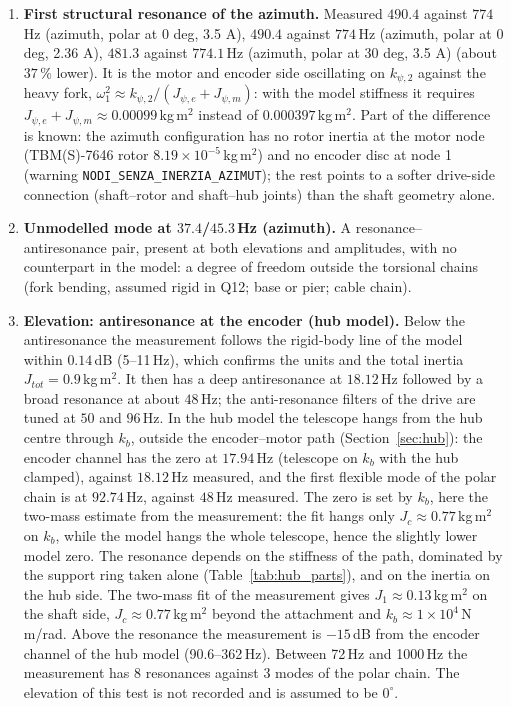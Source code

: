 \documentclass[10pt,a4paper]{article}
\numberwithin{equation}{section}
\begin{document}
\begin{enumerate}
\item \textbf{First structural resonance of the azimuth.} Measured $490.4$ against $774$\,Hz (azimuth, polar at 0 deg, 3.5 A), $490.4$ against $774$\,Hz (azimuth, polar at 0 deg, 2.36 A), $481.3$ against $774.1$\,Hz (azimuth, polar at 30 deg, 3.5 A) (about $37\,\%$ lower). It is the motor and encoder side oscillating on $k_{\psi,2}$ against the heavy fork, $\omega_1^2\approx k_{\psi,2}/(J_{\psi,e} + J_{\psi,m})$: with the model stiffness it requires $J_{\psi,e} + J_{\psi,m} \approx 0.00099$\,kg\,m$^2$ instead of $0.000397$\,kg\,m$^2$. Part of the difference is known: the azimuth configuration has no rotor inertia at the motor node (TBM(S)-7646 rotor $8.19\times10^{-5}$\,kg\,m$^2$) and no encoder disc at node 1 (warning \texttt{NODI\_SENZA\_INERZIA\_AZIMUT}); the rest points to a softer drive-side connection (shaft--rotor and shaft--hub joints) than the shaft geometry alone.
\item \textbf{Unmodelled mode at $37.4$/$45.3$\,Hz (azimuth).} A resonance--antiresonance pair, present at both elevations and amplitudes, with no counterpart in the model: a degree of freedom outside the torsional chains (fork bending, assumed rigid in Q12; base or pier; cable chain).
\item \textbf{Elevation: antiresonance at the encoder (hub model).} Below the antiresonance the measurement follows the rigid-body line of the model within $0.14$\,dB (5--11\,Hz), which confirms the units and the total inertia $J_{tot} = 0.9$\,kg\,m$^2$. It then has a deep antiresonance at $18.12$\,Hz followed by a broad resonance at about $48$\,Hz; the anti-resonance filters of the drive are tuned at $50$ and $96$\,Hz. In the hub model the telescope hangs from the hub centre through $k_b$, outside the encoder--motor path (Section~\ref{sec:hub}): the encoder channel has the zero at $17.94$\,Hz (telescope on $k_b$ with the hub clamped), against $18.12$\,Hz measured, and the first flexible mode of the polar chain is at $92.74$\,Hz, against $48$\,Hz measured. The zero is set by $k_b$, here the two-mass estimate from the measurement: the fit hangs only $J_c \approx 0.77$\,kg\,m$^2$ on $k_b$, while the model hangs the whole telescope, hence the slightly lower model zero. The resonance depends on the stiffness of the path, dominated by the support ring taken alone (Table~\ref{tab:hub_parts}), and on the inertia on the hub side. The two-mass fit of the measurement gives $J_1 \approx 0.13$\,kg\,m$^2$ on the shaft side, $J_c \approx 0.77$\,kg\,m$^2$ beyond the attachment and $k_b \approx 1\times10^{4}$\,N\,m/rad. Above the resonance the measurement is $-15$\,dB from the encoder channel of the hub model (90.6--362\,Hz). Between 72\,Hz and 1000\,Hz the measurement has 8 resonances against 3 modes of the polar chain. The elevation of this test is not recorded and is assumed to be $0^\circ$.

\end{enumerate}
\end{document}

